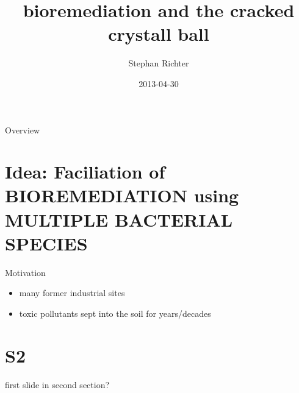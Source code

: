 \documentclass[style=aggie]{powerdot}
\title{bioremediation and the cracked crystall ball}
\author{Stephan Richter}
\date{2013-04-30}
\begin{document}
\maketitle

\begin{slide}{Overview}
\tableofcontents[content=sections]
\end{slide}

\section{Idea: Faciliation of BIOREMEDIATION using MULTIPLE BACTERIAL SPECIES}

\begin{slide}{Motivation}
\begin{itemize}
 \item many former industrial sites
 \item toxic pollutants sept into the soil for years/decades
\end{itemize}

\end{slide}

\section{S2}

\begin{slide}{}
first slide in second section?
\end{slide}
\end{document}
